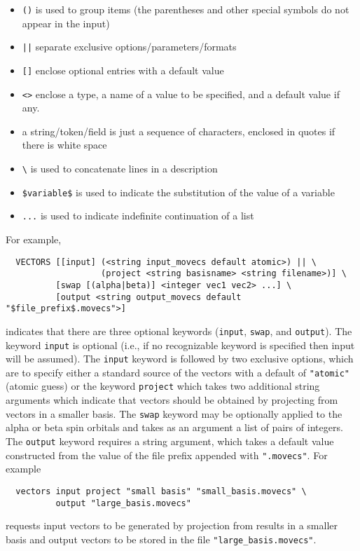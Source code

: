 \begin{itemize}
\item \verb+()+ is used to group items (the parentheses and other
      special symbols do not appear in the input)
\item \verb+||+ separate exclusive options/parameters/formats
\item \verb+[]+ enclose optional entries with a default value
\item \verb+<>+ enclose a type, a name of a value to be specified,
      and a default value if any.
\item a string/token/field is just a sequence of characters, enclosed in
      quotes if there is white space
\item \verb+\+ is used to concatenate lines in a description
\item \verb+$variable$+ is used to indicate the substitution of the value of a
      variable
\item \verb+...+ is used to indicate indefinite continuation of a list
\end{itemize}

For example,
\begin{verbatim}
  VECTORS [[input] (<string input_movecs default atomic>) || \
                   (project <string basisname> <string filename>)] \
          [swap [(alpha|beta)] <integer vec1 vec2> ...] \
          [output <string output_movecs default "$file_prefix$.movecs">]
\end{verbatim}
indicates that there are three optional keywords (\verb+input+,
\verb+swap+, and \verb+output+).  The keyword \verb+input+ is optional
(i.e., if no recognizable keyword is specified then input will be
assumed).  The \verb+input+ keyword is followed by two exclusive
options, which are to specify either a standard source of the vectors
with a default of \verb+"atomic"+ (atomic guess) or the keyword
\verb+project+ which takes two additional string arguments which
indicate that vectors should be obtained by projecting from vectors in
a smaller basis.  The \verb+swap+ keyword may be optionally applied to
the alpha or beta spin orbitals and takes as an argument a list of
pairs of integers. The \verb+output+ keyword requires a string
argument, which takes a default value constructed from the value of
the file prefix appended with \verb+".movecs"+.  For example
\begin{verbatim}
  vectors input project "small basis" "small_basis.movecs" \
          output "large_basis.movecs"
\end{verbatim}
requests input vectors to be generated by projection from
results in a smaller basis and output vectors to be stored in the file
\verb+"large_basis.movecs"+.

